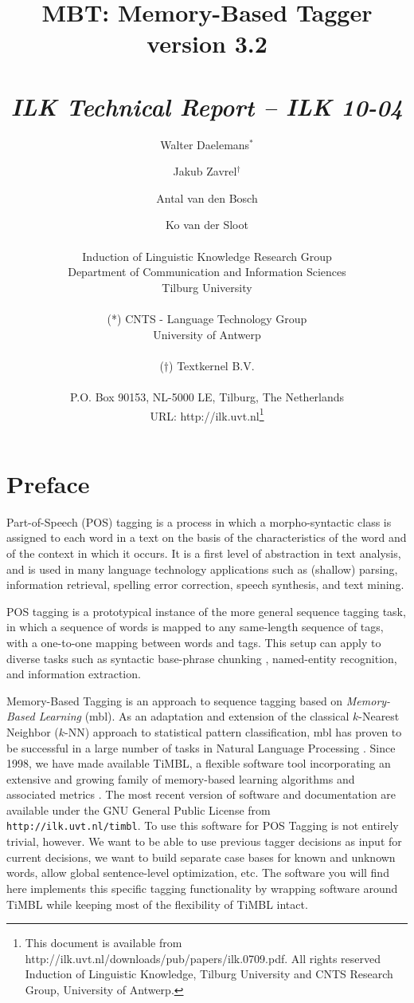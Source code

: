 \documentclass{report}
\author{Walter Daelemans$^*$ \and Jakub Zavrel$^\dagger$ \and
	Antal van den Bosch \and Ko van der Sloot\\ \ \\
	Induction of Linguistic Knowledge Research Group\\
	Department of Communication and Information Sciences\\ 
        Tilburg University \\ \\
	(*) CNTS - Language Technology Group\\
	University of Antwerp\\ \\
	($\dagger$) Textkernel B.V.\\ \\
        P.O. Box 90153, NL-5000 LE, Tilburg, The Netherlands \\ 
        URL: http://ilk.uvt.nl\thanks{This document is available from
	http://ilk.uvt.nl/downloads/pub/papers/ilk.0709.pdf. All rights reserved
	Induction of Linguistic Knowledge, Tilburg University and 
        CNTS Research Group, University of Antwerp.}}
\title{{\huge MBT: Memory-Based Tagger} \\ \vspace*{0.5cm}
{\bf version 3.2} \\ \vspace*{0.5cm}{\huge Reference Guide}\\
\vspace*{1cm} {\it ILK Technical Report -- ILK 10-04}}
\begin{document}

\maketitle

\tableofcontents

\chapter*{Preface}

Part-of-Speech (POS) tagging is a process in which a morpho-syntactic
class is assigned to each word in a text on the basis of the
characteristics of the word and of the context in which it occurs. It
is a first level of abstraction in text analysis, and is used in many
language technology applications such as (shallow) parsing,
information retrieval, spelling error correction, speech synthesis, and
text mining.

POS tagging is a prototypical instance of the more general sequence
tagging task, in which a sequence of words is mapped to any
same-length sequence of tags, with a one-to-one mapping between words
and tags. This setup can apply to diverse tasks such as syntactic
base-phrase chunking \cite{Sang+00}, named-entity recognition, and
information extraction.

Memory-Based Tagging is an approach to sequence tagging based on {\em
  Memory-Based Learning} ({\sc mbl}).  As an adaptation and extension
of the classical $k$-Nearest Neighbor ($k$-NN) approach to statistical
pattern classification, {\sc mbl} has proven to be successful in a
large number of tasks in Natural Language Processing
\cite{Daelemans+05}. Since 1998, we have made available TiMBL, a
flexible software tool incorporating an extensive and growing family
of memory-based learning algorithms and associated metrics
\cite{Daelemans+07}. The most recent version of software and
documentation are available under the GNU General Public License from
{\tt http://ilk.uvt.nl/timbl}.  To use this software for POS Tagging
is not entirely trivial, however. We want to be able to use previous
tagger decisions as input for current decisions, we want to build
separate case bases for known and unknown words, allow global
sentence-level optimization, etc.  The software you will find here
implements this specific tagging functionality by wrapping software
around TiMBL while keeping most of the flexibility of TiMBL intact.
\end{document}
